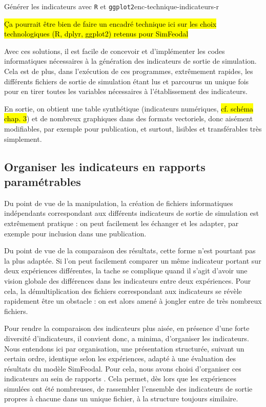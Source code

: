 	\begin{encadre}{Générer les indicateurs avec \texttt{R} et \texttt{ggplot2}}{enc-technique-indicateurs-r}
		
		\hl{Ça pourrait être bien de faire un encadré technique ici sur les choix technologiques (R, dplyr, ggplot2) retenus pour SimFeodal}
		
	\end{encadre}

	Avec ces solutions, il est facile de concevoir et d'implémenter les codes informatiques nécessaires à la génération des indicateurs de sortie de simulation.
	Cela est de plus, dans l'exécution de ces programmes, extrêmement rapides, les différents fichiers de sortie de simulation étant lus et parcourus un unique fois pour en tirer toutes les variables nécessaires à l'établissement des indicateurs.

	En sortie, on obtient une table synthétique (indicateurs numériques, \hl{cf. schéma chap. 3}) et de nombreux graphiques dans des formats vectoriels, donc aisément modifiables, par exemple pour publication, et surtout, lisibles et transférables très simplement.

	\subsection{Organiser les indicateurs en rapports paramétrables}

	Du point de vue de la manipulation, la création de fichiers informatiques indépendants correspondant aux différents indicateurs de sortie de simulation est extrêmement pratique : on peut facilement les échanger et les adapter, par exemple pour inclusion dans une publication.

	Du point de vue de la comparaison des résultats, cette forme n'est pourtant pas la plus adaptée.
	Si l'on peut facilement comparer un même indicateur portant sur deux expériences différentes, la tache se complique quand il s'agit d'avoir une vision globale des différences dans les indicateurs entre deux expériences.
	Pour cela, la démultiplication des fichiers correspondant aux indicateurs se révèle rapidement être un obstacle : on est alors amené à jongler entre de très nombreux fichiers.

	Pour rendre la comparaison des indicateurs plus aisée, en présence d'une forte diversité d'indicateurs, il convient donc, a minima, d'organiser les indicateurs.
	Nous entendons ici par organisation, une présentation structurée, suivant un certain ordre, identique selon les expériences, adapté à une évaluation des résultats du modèle SimFeodal.
	Pour cela, nous avons choisi d'organiser ces \og indicateurs\fg{} au sein de \og rapports \fg{}.
	Cela permet, dès lors que les expériences simulées ont été nombreuses, de rassembler l'ensemble des indicateurs de sortie propres à chacune dans un unique fichier, à la structure toujours similaire.

